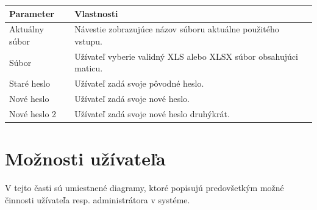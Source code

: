 \documentclass[12pt,a4paper]{report}
\begin{document}
\begin{table}[h!]
	\centering
	\begin{tabular}{|>{\centering\arraybackslash}m{3in}|>{\centering\arraybackslash}m{3in}|}
		\hline
		\centering Parameter & Vlastnosti \\ [0ex]
		\hline
		Aktuálny súbor & Návestie zobrazujúce názov súboru aktuálne použitého vstupu.\\ [0ex]
		\hline
		Súbor & Užívateľ  vyberie  validný XLS alebo XLSX súbor obsahujúci maticu. \\ [0ex]
		\hline
		Staré heslo & Užívateľ zadá svoje pôvodné heslo.\\ [0ex]	
		\hline
		Nové heslo & Užívateľ zadá svoje nové heslo. \\ [0ex]		
		\hline
		Nové heslo 2 & Užívateľ zadá svoje nové heslo druhýkrát. \\ [0ex]		
		\hline
	\end{tabular}
\end{table}
\FloatBarrier
\pagebreak
\section[Možnosti užívateľa]{\rmfamily\bfseries
	Možnosti užívateľa}

V tejto časti sú umiestnené diagramy, ktoré popisujú predovšetkým možné činnosti užívateľa resp. administrátora v systéme.
\end{document}
